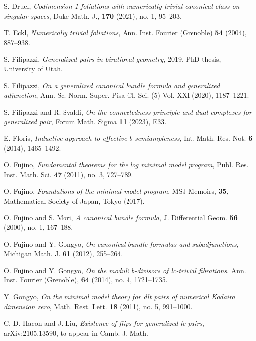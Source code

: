 \documentclass[11pt]{amsart}
\numberwithin{equation}{section}
\theoremstyle{definition}
\theoremstyle{definition}
\theoremstyle{definition}
\begin{document}
\begin{thebibliography}{99}
   S. Druel, \textit{Codimension 1 foliations with numerically trivial canonical class on singular spaces}, Duke Math. J., \textbf{170} (2021), no. 1, 95--203.

   T. Eckl, \textit{Numerically trivial foliations}, Ann. Inst. Fourier (Grenoble) \textbf{54} (2004), 887--938.

   S. Filipazzi, \textit{Generalized pairs in birational geometry}, 2019. PhD thesis, University of Utah.

   S. Filipazzi, \textit{On a generalized canonical bundle formula and generalized adjunction}, Ann. Sc. Norm. Super. Pisa Cl. Sci. (5) Vol. XXI (2020), 1187--1221.

   S. Filipazzi and R. Svaldi, \textit{On the connectedness principle and dual complexes for generalized pair}, Forum Math. Sigma \textbf{11} (2023), E33.

   E. Floris, \textit{Inductive approach to effective b-semiampleness}, Int. Math. Res. Not. \textbf{6} (2014), 1465--1492.

   O. Fujino, \textit{Fundamental theorems for the log minimal model program}, Publ. Res. Inst. Math. Sci. \textbf{47} (2011), no. 3, 727--789.


   O. Fujino, \textit{Foundations of the minimal model program}, MSJ Memoirs, \textbf{35}, Mathematical Society of Japan, Tokyo (2017).

   O. Fujino and S. Mori, \textit{A canonical bundle formula}, J. Differential Geom. \textbf{56} (2000), no. 1, 167--188.

   O. Fujino and Y. Gongyo, \textit{On canonical bundle formulas and subadjunctions}, Michigan Math. J. \textbf{61} (2012), 255--264.

   O. Fujino and Y. Gongyo, \textit{On the moduli b-divisors of lc-trivial fibrations}, Ann. Inst. Fourier (Grenoble), \textbf{64} (2014), no. 4, 1721--1735.

   Y. Gongyo, \textit{On the minimal model theory for dlt pairs of numerical Kodaira dimension zero}, Math. Rest. Lett. \textbf{18} (2011), no. 5, 991--1000.

   C. D. Hacon and J. Liu, \textit{Existence of flips for generalized lc pairs}, arXiv:2105.13590, to appear in Camb. J. Math.


\end{thebibliography}
\end{document}
